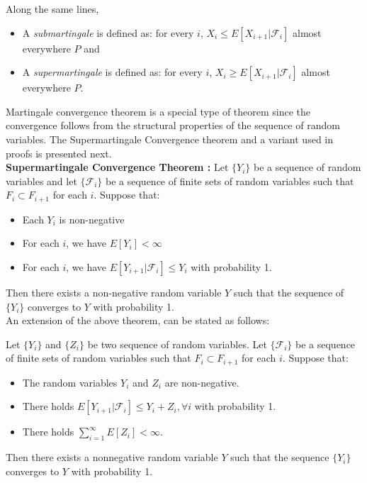 Along the same lines,
\begin{itemize}
\item A \emph{submartingale} is defined as: for every  $i$, $X_i \le E[X_{i+1}|\mathcal{F}_i]$ almost everywhere $P$ and 
\item A \emph{supermartingale} is defined as: for every  $i$, $X_i \ge E[X_{i+1}|\mathcal{F}_i]$ almost everywhere $P$. 
\end{itemize}

Martingale convergence theorem is a special type of theorem since the convergence follows from the structural properties of the sequence of random variables. The Supermartingale Convergence theorem and a variant used in proofs is presented next. \\

\noindent \textbf{Supermartingale Convergence Theorem \cite{Bertsekas_97}: } Let $\{Y_i\}$ be a sequence of random variables and let $\{\mathcal{F}_i\}$ be a sequence of finite sets of random variables such that $F_i \subset F_{i+1}$ for each $i$. Suppose that:
\begin{itemize}
\item Each $Y_i$ is non-negative
\item For each $i$, we have $E[Y_i] < \infty$
\item For each $i$, we have $E[Y_{i+1}|\mathcal{F}_i] \le Y_i$ with probability 1. 
\end{itemize}
Then there exists a non-negative random variable $Y$ such that the sequence of $\{Y_i\}$ converges to $Y$ with probability 1.\\

\noindent An extension of the above theorem, can be stated as follows:

Let $\{Y_i\}$ and $\{Z_i\}$ be two sequence of random variables. Let $\{\mathcal{F}_i\}$ be a sequence of finite sets of random variables such that $F_i \subset F_{i+1}$ for each $i$. Suppose that:
\begin{itemize}
\item The random variables $Y_i$ and $Z_i$ are non-negative.
\item There holds $E[Y_{i+1}|\mathcal{F}_i] \le Y_i+Z_i, \forall i$ with probability 1.
\item There holds $\sum_{i=1}^{\infty} E[Z_i] < \infty$.
\end{itemize}
Then there exists a nonnegative random variable $Y$ such that the sequence $\{Y_i\}$ converges to $Y$ with probability 1. \\



